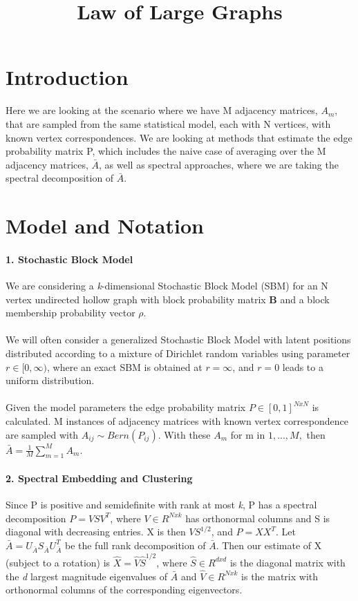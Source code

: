 \documentclass[11pt]{article}
\title{Law of Large Graphs}
\author{}
\date{}
\begin{document}
\large
\maketitle
\thispagestyle{headings}

\vspace{-.5in}

\section{Introduction}
Here we are looking at the scenario where we have M adjacency matrices, $A_m$, that are sampled from the same statistical model, each with N vertices, with known vertex correspondences.  We are looking at methods that estimate the edge probability matrix P, which includes the naive case of averaging over the M adjacency matrices, $\bar{A}$, as well as spectral approaches, where we are taking the spectral decomposition of $\bar{A}$.
\section{Model and Notation}
\paragraph{1. Stochastic Block Model}
We are considering a \textit{k}-dimensional Stochastic Block Model (SBM) for an N vertex undirected hollow graph with block probability matrix \textbf{B} and a block membership probability vector $\rho$.\\\\
We will often consider a generalized Stochastic Block Model with latent positions distributed according to a mixture of Dirichlet random variables using parameter $r \in [0,  \infty )$,  where an exact SBM is obtained at $r = \infty$, and $r = 0$ leads to a uniform distribution.\\\\
Given the model parameters the edge probability matrix $P \in [0,1]^{NxN}$ is calculated.  M instances of adjacency matrices with known vertex correspondence are sampled with $A_{ij} \sim Bern(P_{ij})$.  With these $A_m$ for m in $1,...,M,$ then $\bar{A} = \frac{1}{M}\sum\limits_{m = 1}^M A_m$.

\paragraph{2. Spectral Embedding and Clustering} Since P is positive and semidefinite with rank at most \textit{k}, P has a spectral decomposition $P = VSV^T$, where $V \in R^{Nxk}$ has orthonormal columns and S is diagonal with decreasing entries.  X is then $VS^{1/2}$, and $P=XX^T$.  Let $\bar{A} = U_{\bar{A}}S_{\bar{A}}U_{\bar{A}}^T$ be the full rank decomposition of $\bar{A}$.  Then our estimate of X (subject to a rotation) is $\hat{X} = \hat{V}\hat{S}^{1/2}$, where $\hat{S} \in R^{dxd}$ is the diagonal matrix with the \textit{d} largest magnitude eigenvalues of $\bar{A}$ and $\hat{V} \in R^{Nxk}$ is the matrix with orthonormal columns of the corresponding eigenvectors.
\end{document}
